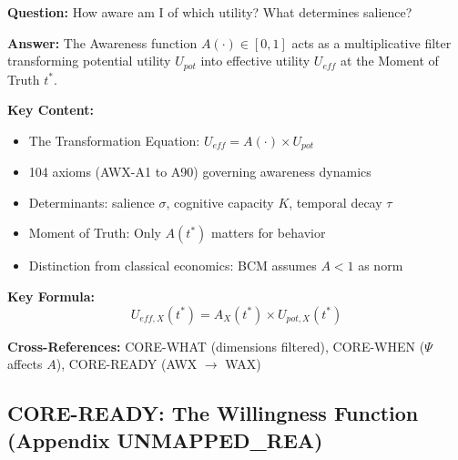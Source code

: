\begin{tcolorbox}[colback=gray!5!white, colframe=gray!75!black]
\textbf{Question:} How aware am I of which utility? What determines salience?

\textbf{Answer:} The Awareness function $A(\cdot) \in [0,1]$ acts as a multiplicative filter
transforming potential utility $U_{pot}$ into effective utility $U_{eff}$ at the Moment of Truth $t^*$.

\textbf{Key Content:}
\begin{itemize}[nosep]
\item The Transformation Equation: $U_{eff} = A(\cdot) \times U_{pot}$
\item 104 axioms (AWX-A1 to A90) governing awareness dynamics
\item Determinants: salience $\sigma$, cognitive capacity $K$, temporal decay $\tau$
\item Moment of Truth: Only $A(t^*)$ matters for behavior
\item Distinction from classical economics: BCM assumes $A < 1$ as norm
\end{itemize}

\textbf{Key Formula:}
\begin{equation}
U_{eff,X}(t^*) = A_X(t^*) \times U_{pot,X}(t^*)
\end{equation}

\textbf{Cross-References:} CORE-WHAT (dimensions filtered), CORE-WHEN ($\Psi$ affects $A$), CORE-READY (AWX $\to$ WAX)
\end{tcolorbox}

\subsection{CORE-READY: The Willingness Function (Appendix UNMAPPED_REA)}

